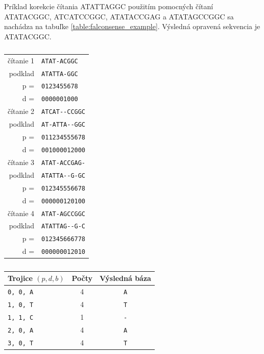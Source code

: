 Príklad korekcie čítania ATATTAGGC použitím pomocných čítaní ATATACGGC, ATCATCCGGC, ATATACCGAG a ATATAGCCGGC sa nachádza na tabuľke \ref{table:falconsense_example}. Výsledná opravená sekvencia je ATATACGGC.


\begin{table}
    \begin{subtable}{.5\linewidth}
        \centering
\begin{tabular}{ r  l }
	\hline
	čítanie 1 & \verb|ATAT-ACGGC| \\
	podklad   & \verb|ATATTA-GGC| \\
	p =       & \verb|0123455678| \\
	d =       & \verb|0000001000| \\
	\hline
	čítanie 2 & \verb|ATCAT--CCGGC| \\
	podklad   & \verb|AT-ATTA--GGC| \\
	p =       & \verb|011234555678| \\
	d =       & \verb|001000012000| \\
	\hline
	čítanie 3 & \verb|ATAT-ACCGAG-| \\
	podklad   & \verb|ATATTA--G-GC| \\
	p =       & \verb|012345556678| \\
	d =       & \verb|000000120100| \\
	\hline
	čítanie 4 & \verb|ATAT-AGCCGGC| \\
	podklad   & \verb|ATATTAG--G-C| \\
	p =       & \verb|012345666778| \\
	d =       & \verb|000000012010| \\
	\hline
\end{tabular}
        \caption{}
        \label{subtable:falconsense_alignments}
    \end{subtable}
    \begin{subtable}{.5\linewidth}
        \centering
        \begin{tabular}{ l c c }
        	\hline
           	Trojice $(p, d, b)$ & Počty & Výsledná báza \\ \hline \hline
           	 \verb|0, 0, A| & 4 &  \verb|A| \\
           	 \verb|1, 0, T| & 4 &  \verb|T| \\
           	 \verb|1, 1, C| & 1 &  \verb|-| \\
           	 \verb|2, 0, A| & 4 &  \verb|A| \\
           	 \verb|3, 0, T| & 4 &  \verb|T| \\

\end{tabular}
\end{subtable}
\end{table}
